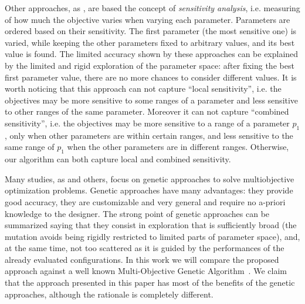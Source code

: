 Other approaches, as \cite{fornaciari_codes01,palesi_iwsoc02}, are based the concept of \emph{sensitivity analysis}, i.e. measuring of how much the objective varies when varying each parameter.
Parameters are ordered based on their sensitivity. The first parameter (the most sensitive one) is varied, while keeping the other parameters fixed to arbitrary values, and its best value is found. The limited accuracy shown by these approaches can be explained by the limited and rigid exploration of the parameter
space: after fixing the best first parameter value, there are no more chances to consider different values. It is worth noticing that this approach can not capture
``local sensitivity'', i.e. the objectives may be more sensitive to some
ranges of a parameter and less sensitive to other ranges of the same
parameter. Moreover it can not capture ``combined sensitivity'', i.e. the objectives may be
more sensitive to a range of a parameter $p_{1}$, only when other
parameters are within certain ranges, and less sensitive to the same
range of $p_{1}$ when the other parameters are in different ranges. Otherwise, our algorithm can both capture local and combined sensitivity.


Many studies, as \cite{coello_easmop} and others, focus on genetic approaches to solve multiobjective
optimization problems. Genetic approaches
have many advantages: they provide good accuracy, they are customizable and very general
and require no a-priori knowledge to the designer.  The strong
point of genetic approaches can be summarized saying that they consist
in exploration that is sufficiently broad (the mutation avoids being rigidly restricted to limited parts of parameter space), and, at the same time, not too scattered as it is guided by the performances of
the already evaluated configurations. In this work we will compare 
the proposed approach against a well known Multi-Objective Genetic
Algorithm~\cite{knowles_techrep06}.
We claim that the approach presented in this paper has most of the benefits of the genetic
approaches, although the rationale is completely different.

